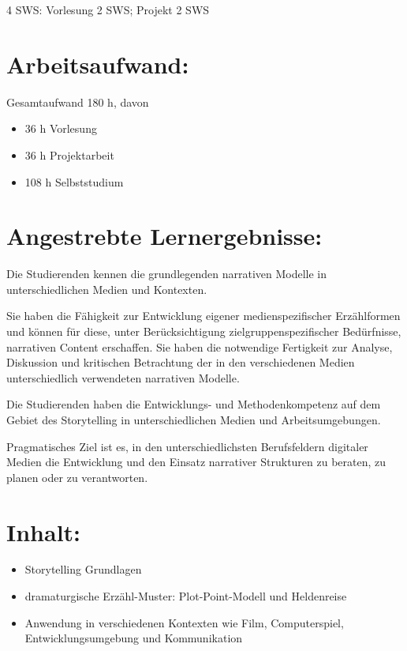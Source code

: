 4 SWS: Vorlesung 2 SWS; Projekt 2 SWS

\section*{Arbeitsaufwand:}\label{arbeitsaufwand-23}

Gesamtaufwand 180 h, davon

\begin{itemize}
\tightlist
\item
  36 h Vorlesung
\item
  36 h Projektarbeit
\item
  108 h Selbststudium
\end{itemize}

\section*{Angestrebte
Lernergebnisse:}\label{angestrebte-lernergebnisse-17}

Die Studierenden kennen die grundlegenden narrativen Modelle in
unterschiedlichen Medien und Kontexten.

Sie haben die Fähigkeit zur Entwicklung eigener medienspezifischer
Erzählformen und können für diese, unter Berücksichtigung
zielgruppenspezifischer Bedürfnisse, narrativen Content erschaffen. Sie
haben die notwendige Fertigkeit zur Analyse, Diskussion und kritischen
Betrachtung der in den verschiedenen Medien unterschiedlich verwendeten
narrativen Modelle.

Die Studierenden haben die Entwicklungs- und Methodenkompetenz auf dem
Gebiet des Storytelling in unterschiedlichen Medien und
Arbeitsumgebungen.

Pragmatisches Ziel ist es, in den unterschiedlichsten Berufsfeldern
digitaler Medien die Entwicklung und den Einsatz narrativer Strukturen
zu beraten, zu planen oder zu verantworten.

\section*{Inhalt:}\label{inhalt-17}

\begin{itemize}
\tightlist
\item
  Storytelling Grundlagen
\item
  dramaturgische Erzähl-Muster: Plot-Point-Modell und Heldenreise
\item
  Anwendung in verschiedenen Kontexten wie Film, Computerspiel,
  Entwicklungsumgebung und Kommunikation
\end{itemize}


